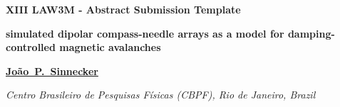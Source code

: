 \documentclass[12pt,a4paper]{article}
\begin{document}
\begin{center}
{\bfseries\fontsize{14}{16}\selectfont XIII LAW3M - Abstract Submission Template}\par
\vspace{6pt}
{\bfseries\fontsize{14}{16}\selectfont simulated dipolar compass-needle arrays as a model for damping-controlled magnetic avalanches}\par
\vspace{10pt}
{\bfseries\fontsize{12}{14}\selectfont \uline{Jo\~ao~P.~Sinnecker}}\par
\vspace{6pt}
{\itshape\fontsize{12}{14}\selectfont Centro Brasileiro de Pesquisas F\'isicas (CBPF), Rio de Janeiro, Brazil}\par
\end{center}
\vspace{10pt}
\end{document}
